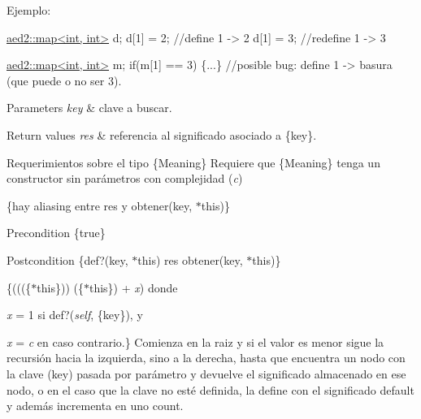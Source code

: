 Ejemplo\+: 
\begin{DoxyCode}
\hyperlink{classaed2_1_1map}{aed2::map<int, int>} d;
d[1] = 2;      \textcolor{comment}{//define 1 -> 2}
d[1] = 3;      \textcolor{comment}{//redefine 1 -> 3}

\hyperlink{classaed2_1_1map}{aed2::map<int, int>} m;
\textcolor{keywordflow}{if}(m[1] == 3) \{...\} \textcolor{comment}{//posible bug: define 1 -> basura (que puede o no ser 3).}
\end{DoxyCode}



\begin{DoxyParams}{Parameters}
{\em key} & clave a buscar. \\
\hline
\end{DoxyParams}

\begin{DoxyRetVals}{Return values}
{\em res} & referencia al significado asociado a \{key\}.\\
\hline
\end{DoxyRetVals}
\begin{DoxyParagraph}{Requerimientos sobre el tipo \{Meaning\}}
Requiere que \{Meaning\} tenga un constructor sin parámetros con complejidad ({\itshape c})
\end{DoxyParagraph}
\{hay aliasing entre res y obtener(key, $\ast$this)\}

\begin{DoxyPrecond}{Precondition}
\{true\} 
\end{DoxyPrecond}
\begin{DoxyPostcond}{Postcondition}
\{def?(key, $\ast$this)  res  obtener(key, $\ast$this)\}
\end{DoxyPostcond}
\{(((\{$\ast$this\}))  (\{$\ast$this\}) + {\itshape x}) donde
\begin{DoxyItemize}
\item {\itshape x} = 1 si def?({\itshape self}, \{key\}), y
\item {\itshape x} = {\itshape c} en caso contrario.\} Comienza en la raiz y si el valor es menor sigue la recursión hacia la izquierda, sino a la derecha, hasta que encuentra un nodo con la clave (key) pasada por parámetro y devuelve el significado almacenado en ese nodo, o en el caso que la clave no esté definida, la define con el significado default y además incrementa en uno count. 
\end{DoxyItemize}\mbox{\label{classaed2_1_1map_ac412d3902112122c1bffe2d4283a4e9d}} 
